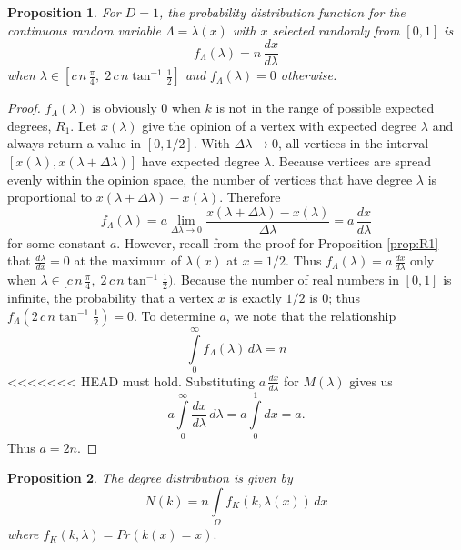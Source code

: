 \documentclass[a4paper,10pt]{article}
\newtheorem{prop}{Proposition}
\begin{document}
\begin{prop}
 For $D=1$, the probability distribution function for the continuous random variable $\Lambda = \lambda(x)$ with $x$ selected randomly from $[0, 1]$ is
 \begin{equation}
  f_\Lambda(\lambda) = n \,\frac{dx}{d\lambda}
 \end{equation}
when $\lambda \in [c\,n\,\frac{\pi}{4},\; 2\,c\,n \tan^{-1}\frac{1}{2}]$ and $f_\Lambda(\lambda) = 0$ otherwise. \end{prop}
\begin{proof}
$f_\Lambda(\lambda)$ is obviously 0 when $k$ is not in the range of possible expected degrees, $R_1$. Let $x(\lambda)$ give the opinion of a vertex with expected degree $\lambda$ and always return a value in $[0, 1/2]$. With $\Delta \lambda \to 0$, all vertices in the interval $[x(\lambda), x(\lambda + \Delta \lambda)]$ have expected degree $\lambda$. Because vertices are spread evenly within the opinion space, the number of vertices that have degree $\lambda$ is proportional to $x(\lambda + \Delta \lambda) - x(\lambda)$. Therefore
\begin{equation}
 f_\Lambda(\lambda) = a \lim\limits_{\Delta \lambda \to 0} \frac{x(\lambda + \Delta \lambda) - x(\lambda)}{\Delta \lambda} = a \, \frac{dx}{d\lambda}
\end{equation}
for some constant $a$. However, recall from the proof for Proposition \ref{prop:R1} that $\frac{d\lambda}{dx} = 0$ at the maximum of $\lambda(x)$ at $x=1/2$. Thus $f_\Lambda(\lambda) = a \, \frac{dx}{d\lambda}$ only when $\lambda \in  [c\,n\,\frac{\pi}{4},\; 2\,c\,n \tan^{-1}\frac{1}{2})$. Because the number of real numbers in $[0, 1]$ is infinite, the probability that a vertex $x$ is exactly $1/2$ is 0; thus $f_\Lambda(2\,c\,n \tan^{-1}\frac{1}{2}) = 0$. To determine $a$, we note that the relationship 
\begin{equation}
 \int\limits_{0}^\infty f_\Lambda(\lambda)\, d\lambda = n
\end{equation}
<<<<<<< HEAD
must hold. Substituting $a \, \frac{dx}{d\lambda}$ for $M(\lambda)$ gives us 
\begin{equation}
 a\int\limits_{0}^\infty \frac{dx}{d\lambda} \, d\lambda = a\int\limits_{0}^1 dx = a.
\end{equation}
Thus $a = 2n$.
\end{proof}

\begin{prop}
 The degree distribution is given by
 \begin{equation}
  N(k) = n \int\limits_\Omega f_K(k, \lambda(x))\, dx
 \end{equation}
 where $f_K(k, \lambda) = Pr(k(x) = x).$ 
\end{prop}
\end{document}
